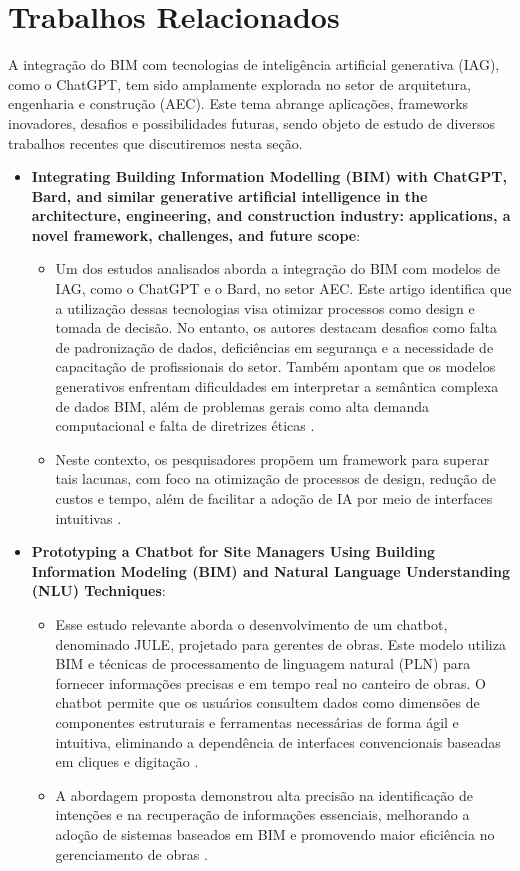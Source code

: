 \chapter{Trabalhos Relacionados}

A integração do BIM com tecnologias de inteligência artificial generativa (IAG), como o ChatGPT, tem sido amplamente explorada no setor de arquitetura, engenharia e construção (AEC). Este tema abrange aplicações, frameworks inovadores, desafios e possibilidades futuras, sendo objeto de estudo de diversos trabalhos recentes que discutiremos nesta seção.

\begin{itemize}    
    \item \textbf {Integrating Building Information Modelling (BIM) with ChatGPT, Bard, and similar generative artificial intelligence in the architecture, engineering, and construction industry: applications, a novel framework, challenges, and future scope}: 
    
    \begin{itemize}
        \item   Um dos estudos analisados aborda a integração do BIM com modelos de IAG, como o ChatGPT e o Bard, no setor AEC. Este artigo identifica que a utilização dessas tecnologias visa otimizar processos como design e tomada de decisão. No entanto, os autores destacam desafios como falta de padronização de dados, deficiências em segurança e a necessidade de capacitação de profissionais do setor. Também apontam que os modelos generativos enfrentam dificuldades em interpretar a semântica complexa de dados BIM, além de problemas gerais como alta demanda computacional e falta de diretrizes éticas \cite{rane2023}.
        \item   Neste contexto, os pesquisadores propõem um framework para superar tais lacunas, com foco na otimização de processos de design, redução de custos e tempo, além de facilitar a adoção de IA por meio de interfaces intuitivas \cite{rane2023}.
    \end{itemize}
    
    \item \textbf {Prototyping a Chatbot for Site Managers Using Building Information Modeling (BIM) and Natural Language Understanding (NLU) Techniques}: 
    \begin{itemize}
        \item   Esse estudo relevante aborda o desenvolvimento de um chatbot, denominado JULE, projetado para gerentes de obras. Este modelo utiliza BIM e técnicas de processamento de linguagem natural (PLN) para fornecer informações precisas e em tempo real no canteiro de obras. O chatbot permite que os usuários consultem dados como dimensões de componentes estruturais e ferramentas necessárias de forma ágil e intuitiva, eliminando a dependência de interfaces convencionais baseadas em cliques e digitação \cite{lin2023}.
        \item   A abordagem proposta demonstrou alta precisão na identificação de intenções e na recuperação de informações essenciais, melhorando a adoção de sistemas baseados em BIM e promovendo maior eficiência no gerenciamento de obras \cite{lin2023}.
    \end{itemize}


\end{itemize}
